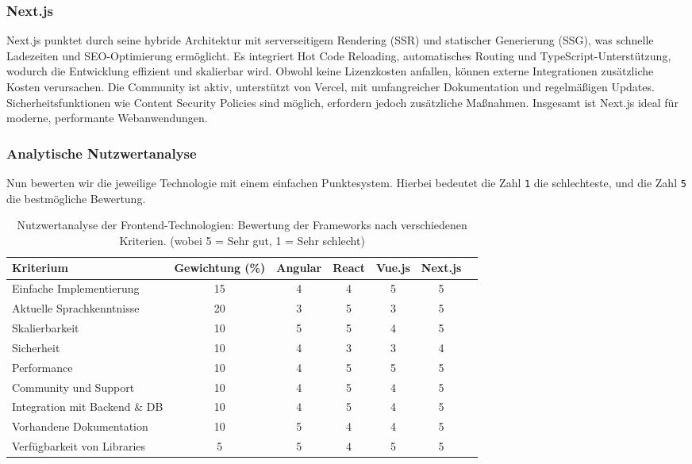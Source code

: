 \subsubsection{Next.js}

Next.js punktet durch seine hybride Architektur mit serverseitigem Rendering (SSR) und statischer Generierung (SSG), was schnelle Ladezeiten und SEO-Optimierung ermöglicht. Es integriert Hot Code Reloading, automatisches Routing und TypeScript-Unterstützung, wodurch die Entwicklung effizient und skalierbar wird.
Obwohl keine Lizenzkosten anfallen, können externe Integrationen zusätzliche Kosten verursachen. Die Community ist aktiv, unterstützt von Vercel, mit umfangreicher Dokumentation und regelmäßigen Updates. Sicherheitsfunktionen wie Content Security Policies sind möglich, erfordern jedoch zusätzliche Maßnahmen. Insgesamt ist Next.js ideal für moderne, performante Webanwendungen.  \textit{\cite{nextjs, nextjs_blog}}

\subsubsection{Analytische Nutzwertanalyse}

Nun bewerten wir die jeweilige Technologie mit einem einfachen Punktesystem. Hierbei bedeutet die Zahl \texttt{1} die schlechteste, und die Zahl \texttt{5} die bestmögliche Bewertung.



\begin{table}[H]
	\centering
	\renewcommand{\arraystretch}{1.2}
	\begin{tabular}{|l|c|c|c|c|c|c|}
		\hline
		\rowcolor[HTML]{B6D7A8} \textbf{Kriterium} & \textbf{Gewichtung (\%)} & \textbf{Angular} & \textbf{React} & \textbf{Vue.js} & \textbf{Next.js} \\
		\hline
		Einfache Implementierung & 15 & 4 & 4 & 5 & 5 \\
		\hline
		Aktuelle Sprachkenntnisse & 20 & 3 & 5 & 3 & 5 \\
		\hline
		Skalierbarkeit & 10 & 5 & 5 & 4 & 5 \\
		\hline
		Sicherheit & 10 & 4 & 3 & 3 & 4 \\
		\hline
		Performance & 10 & 4 & 5 & 5 & 5 \\
		\hline
		Community und Support & 10 & 4 & 5 & 4 & 5 \\
		\hline
		Integration mit Backend \& DB & 10 & 4 & 5 & 4 & 5 \\
		\hline
		Vorhandene Dokumentation & 10 & 5 & 4 & 4 & 5 \\
		\hline
		Verfügbarkeit von Libraries & 5 & 5 & 4 & 5 & 5 \\
		\hline
	\end{tabular}
	\caption{Nutzwertanalyse der Frontend-Technologien: Bewertung der Frameworks nach verschiedenen Kriterien. (wobei 5 = Sehr gut, 1 = Sehr schlecht)}
\end{table}


